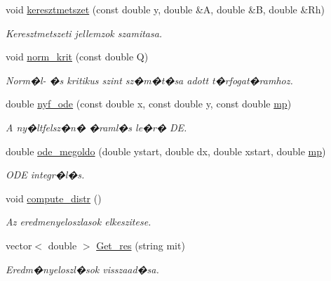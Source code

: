 \begin{DoxyCompactItemize}
void \hyperlink{class_csatorna_ab9528187fc3d40d210c85b72d7856f10}{keresztmetszet} (const double y, double \&A, double \&B, double \&Rh)
\begin{DoxyCompactList}\small\item\em Keresztmetszeti jellemzok szamitasa. \end{DoxyCompactList}\item 
\mbox{\label{class_csatorna_af30a5d124d26bd31548cf243c4a95178}} 
void \hyperlink{class_csatorna_af30a5d124d26bd31548cf243c4a95178}{norm\+\_\+krit} (const double Q)
\begin{DoxyCompactList}\small\item\em Norm�l-\/ �s kritikus szint sz�m�t�sa adott t�rfogat�ramhoz. \end{DoxyCompactList}\item 
double \hyperlink{class_csatorna_aacea0461de03c4592e89cee026c2e1d5}{nyf\+\_\+ode} (const double x, const double y, const double \hyperlink{class_agelem_a1377d80d8511cc4adacccba31d28282d}{mp})
\begin{DoxyCompactList}\small\item\em A ny�ltfelsz�n� �raml�s le�r� DE. \end{DoxyCompactList}\item 
double \hyperlink{class_csatorna_a17e55cbde88d58985f7e315e7069ba3a}{ode\+\_\+megoldo} (double ystart, double dx, double xstart, double \hyperlink{class_agelem_a1377d80d8511cc4adacccba31d28282d}{mp})
\begin{DoxyCompactList}\small\item\em O\+DE integr�l�s. \end{DoxyCompactList}\item 
void \hyperlink{class_csatorna_a2ad82029529f1aa2b4da3122b608eb6c}{compute\+\_\+distr} ()
\begin{DoxyCompactList}\small\item\em Az eredmenyeloszlasok elkeszitese. \end{DoxyCompactList}\item 
\mbox{\label{class_csatorna_ab515ee9bcf30c35c22b23fd0617cc422}} 
vector$<$ double $>$ \hyperlink{class_csatorna_ab515ee9bcf30c35c22b23fd0617cc422}{Get\+\_\+res} (string mit)
\begin{DoxyCompactList}\small\item\em Eredm�nyeloszl�sok visszaad�sa. \end{DoxyCompactList}\item 

\end{DoxyCompactItemize}
